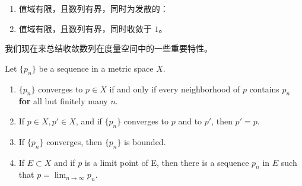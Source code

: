 \documentclass[../poma-notes.tex]{subfiles}
\begin{document}
\begin{anote}
\begin{enumerate}[label=(\alph*)]
          \begin{center}
          \end{center}
    \item 值域有限，且数列有界，同时为发散的：
          \begin{center}
          \end{center}
    \item 值域有限，且数列有界，同时收敛于 $1$。
  \end{enumerate}
\end{anote}

我们现在来总结收敛数列在度量空间中的一些重要特性。

\begin{theorem}
  Let $\{p_n\}$ be a sequence in a metric space $X$.
  \begin{enumerate}[label=(\alph*)]
    \item $\{p_n\}$ converges to $p \in X$ if and only if every neighborhood of $p$ contains $p_n$ \textbf{for}
          all but finitely many $n$.
    \item If $p \in X, p' \in X$, and if $\{p_n\}$ converges to $p$ and to $p'$, then $p' = p$.
    \item If $\{p_n\}$ converges, then $\{p_n\}$ is bounded.
    \item If $E \subset X$ and if $p$ is a limit point of E, then there is a sequence ${p_n}$ in $E$ such that
          $p=\lim_{n \to \infty} p_n$.
  \end{enumerate}
\end{theorem}
\end{document}
